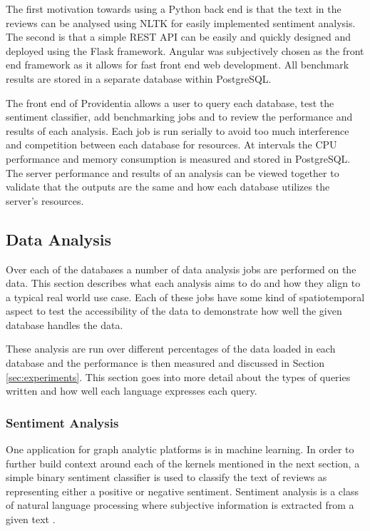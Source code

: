The first motivation towards using a Python back end is that the text in the reviews can be analysed using NLTK for easily implemented sentiment analysis. The second is that a simple REST API can be easily and quickly designed and deployed using the Flask framework. Angular was subjectively chosen as the front end framework as it allows for fast front end web development. All benchmark results are stored in a separate database within PostgreSQL.

The front end of Providentia allows a user to query each database, test the sentiment classifier, add benchmarking jobs and to review the performance and results of each analysis. Each job is run serially to avoid too much interference and competition between each database for resources. At intervals the CPU performance and memory consumption is measured and stored in PostgreSQL. The server performance and results of an analysis can be viewed together to validate that the outputs are the same and how each database utilizes the server's resources.

\subsection{Data Analysis}
Over each of the databases a number of data analysis jobs are performed on the data. This section describes what each analysis aims to do and how they align to a typical real world use case. Each of these jobs have some kind of spatiotemporal aspect to test the accessibility of the data to demonstrate how well the given database handles the data.

These analysis are run over different percentages of the data loaded in each database and the performance is then measured and discussed in Section \ref{sec:experiments}. This section goes into more detail about the types of queries written and how well each language expresses each
query.

\subsubsection{Sentiment Analysis}
One application for graph analytic platforms is in machine learning. In order to further build context around each of the kernels mentioned in the next section, a simple binary sentiment classifier is used to classify the text of reviews as representing either a positive or negative sentiment. Sentiment analysis is a class of natural language processing where subjective information is extracted from a given text \cite{sentiment-analysis-gupta}.

